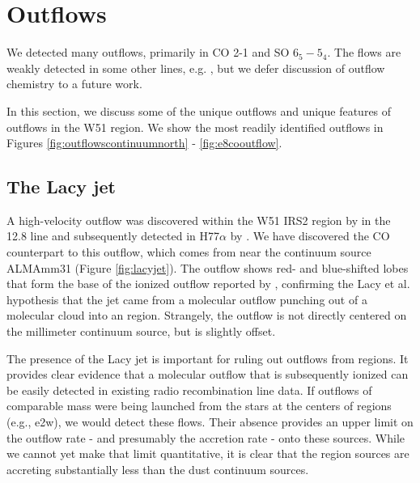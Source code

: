 \documentclass{emulateapj}
\begin{document}


%
%
%
%
%
%
%


\section{Outflows}
\label{sec:outflows}
We detected many outflows, primarily in CO 2-1 and SO $6_5-5_4$.  The flows are
weakly detected in some other lines, e.g. \formaldehyde, but we defer
discussion of outflow chemistry to a future work.

In this section, we discuss some of the unique outflows and unique features of
outflows in the W51 region.  We show the most readily identified outflows in
Figures \ref{fig:outflowscontinuumnorth} - \ref{fig:e8cooutflow}.

\subsection{The Lacy jet}
\label{sec:lacyjet}
A high-velocity outflow was discovered within the W51 IRS2 region by
\citet{Lacy2007a} in the 12.8 \um [Ne II] line and subsequently detected in
H77$\alpha$ by \citet{Ginsburg2016b}.  We have discovered the CO counterpart to
this
outflow, which comes from near the continuum source ALMAmm31 (Figure
\ref{fig:lacyjet}).
The outflow shows red- and blue-shifted lobes
that form the base of the ionized outflow reported by \citet[][Figure
\ref{fig:outflowscontinuumnorth}]{Lacy2007a},
confirming the Lacy et al. hypothesis that the jet came
from a molecular outflow punching out of a molecular cloud into an \hii region.
Strangely, the outflow is not directly centered on the millimeter continuum
source, but is slightly offset.  

The presence of the Lacy jet is important for ruling out outflows from \hii
regions.  It provides clear evidence that a molecular outflow that is
subsequently ionized can be easily detected in existing radio recombination
line data.  If outflows of comparable mass were being launched from the stars
at the centers of \hchii regions (e.g., e2w), we would detect these flows.
Their absence provides an upper limit on the outflow rate - and presumably the
accretion rate - onto these sources.  While we cannot yet make that limit
quantitative, it is clear that the \hchii region sources are accreting
substantially less than the dust continuum sources.
\end{document}
